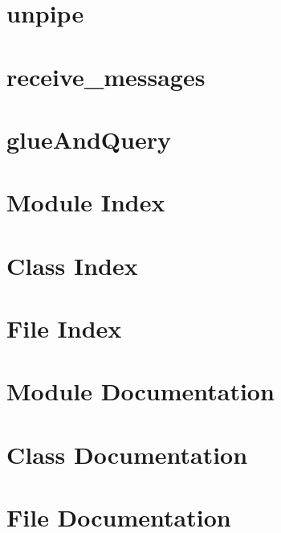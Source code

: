 \documentclass[twoside]{book}
\begin{document}
\chapter{unpipe}
\label{unpipe}
\hypertarget{unpipe}{}

\chapter{receive\-\_\-messages}
\label{receive_messages}
\hypertarget{receive_messages}{}

\chapter{glue\-And\-Query}
\label{glue_and_query}
\hypertarget{glue_and_query}{}

\chapter{Module Index}

\chapter{Class Index}

\chapter{File Index}

\chapter{Module Documentation}


\chapter{Class Documentation}


\chapter{File Documentation}


















\newpage
{}
{}
\printindex
\end{document}
